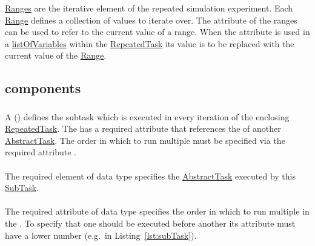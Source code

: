 \hyperref[class:range]{Ranges} are the iterative element of the repeated simulation experiment. Each \hyperref[class:range]{Range} defines a collection of values to iterate over. The \hyperref[sec:id]{} attribute of the ranges can be used to refer to the current value of a range. When the \hyperref[sec:id]{} attribute is used in a \hyperref[sec:listOfVariables]{listOfVariables} within the \hyperref[class:repeatedTask]{RepeatedTask} its value is to be replaced with the current value of the \hyperref[class:range]{Range}.


\subsection{ components}
\label{class:taskComponents}

\subsubsection{}
\label{class:subTask}
A  () defines the subtask which is executed in every iteration of the enclosing \hyperref[class:repeatedTask]{RepeatedTask}. The  has a required attribute \hyperref[sec:subTaskTask]{} that references the \hyperref[sec:id]{} of another \hyperref[class:abstractTask]{AbstractTask}. The order in which to run multiple  must be specified via the required attribute \hyperref[sec:subTaskOrder]{}. 

\paragraph*{}
\label{sec:subTaskTask}
The required element  of data type \hyperref[type:sidref]{} specifies the \hyperref[class:abstractTask]{AbstractTask} executed by this \hyperref[class:subTask]{SubTask}.

\paragraph*{}
\label{sec:subTaskOrder}
The required attribute  of data type  specifies the order in which to run multiple  in the \hyperref[sec:listOfSubTasks]{}. To specify that one  should be executed before another its  attribute must have a lower number (e.g.\ in Listing~\ref{lst:subTask}).



